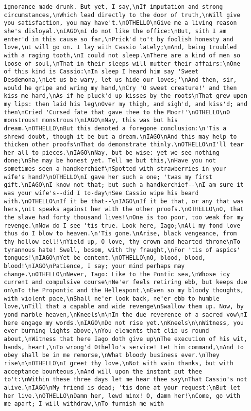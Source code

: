 \begin{verbatim}
ignorance made drunk. But yet, I say,\nIf imputation and strong circumstances,\nWhich lead directly to the door of truth,\nWill give you satisfaction, you may have't.\nOTHELLO\nGive me a living reason she's disloyal.\nIAGO\nI do not like the office:\nBut, sith I am enter'd in this cause so far,\nPrick'd to't by foolish honesty and love,\nI will go on. I lay with Cassio lately;\nAnd, being troubled with a raging tooth,\nI could not sleep.\nThere are a kind of men so loose of soul,\nThat in their sleeps will mutter their affairs:\nOne of this kind is Cassio:\nIn sleep I heard him say 'Sweet Desdemona,\nLet us be wary, let us hide our loves;'\nAnd then, sir, would he gripe and wring my hand,\nCry 'O sweet creature!' and then kiss me hard,\nAs if he pluck'd up kisses by the roots\nThat grew upon my lips: then laid his leg\nOver my thigh, and sigh'd, and kiss'd; and then\nCried 'Cursed fate that gave thee to the Moor!'\nOTHELLO\nO monstrous! monstrous!\nIAGO\nNay, this was but his dream.\nOTHELLO\nBut this denoted a foregone conclusion:\n'Tis a shrewd doubt, though it be but a dream.\nIAGO\nAnd this may help to thicken other proofs\nThat do demonstrate thinly.\nOTHELLO\nI'll tear her all to pieces.\nIAGO\nNay, but be wise: yet we see nothing done;\nShe may be honest yet. Tell me but this,\nHave you not sometimes seen a handkerchief\nSpotted with strawberries in your wife's hand?\nOTHELLO\nI gave her such a one; 'twas my first gift.\nIAGO\nI know not that; but such a handkerchief--\nI am sure it was your wife's--did I to-day\nSee Cassio wipe his beard with.\nOTHELLO\nIf it be that--\nIAGO\nIf it be that, or any that was hers,\nIt speaks against her with the other proofs.\nOTHELLO\nO, that the slave had forty thousand lives!\nOne is too poor, too weak for my revenge.\nNow do I see 'tis true. Look here, Iago;\nAll my fond love thus do I blow to heaven.\n'Tis gone.\nArise, black vengeance, from thy hollow cell!\nYield up, O love, thy crown and hearted throne\nTo tyrannous hate! Swell, bosom, with thy fraught,\nFor 'tis of aspics' tongues!\nIAGO\nYet be content.\nOTHELLO\nO, blood, blood, blood!\nIAGO\nPatience, I say; your mind perhaps may change.\nOTHELLO\nNever, Iago: Like to the Pontic sea,\nWhose icy current and compulsive course\nNe'er feels retiring ebb, but keeps due on\nTo the Propontic and the Hellespont,\nEven so my bloody thoughts, with violent pace,\nShall ne'er look back, ne'er ebb to humble love,\nTill that a capable and wide revenge\nSwallow them up. Now, by yond marble heaven,\nKneels\n\nIn the due reverence of a sacred vow\nI here engage my words.\nIAGO\nDo not rise yet.\nKneels\n\nWitness, you ever-burning lights above,\nYou elements that clip us round about,\nWitness that here Iago doth give up\nThe execution of his wit, hands, heart,\nTo wrong'd Othello's service! Let him command,\nAnd to obey shall be in me remorse,\nWhat bloody business ever.\nThey rise\n\nOTHELLO\nI greet thy love,\nNot with vain thanks, but with acceptance bounteous,\nAnd will upon the instant put thee to't:\nWithin these three days let me hear thee say\nThat Cassio's not alive.\nIAGO\nMy friend is dead; 'tis done at your request:\nBut let her live.\nOTHELLO\nDamn her, lewd minx! O, damn her!\nCome, go with me apart; I will withdraw,\nTo furnish me with 
\end{verbatim}

